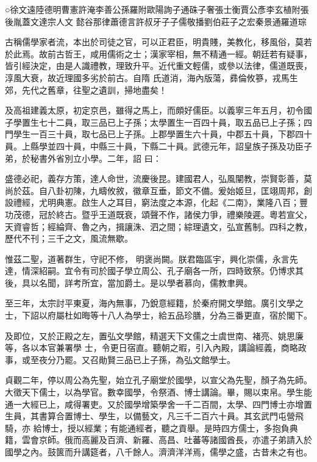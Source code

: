 
\begin{pinyinscope}

 ○徐文遠陸德明曹憲許淹李善公孫羅附歐陽詢子通硃子奢張士衡賈公彥李玄植附張後胤蓋文達宗人文
 懿谷那律蕭德言許叔牙子子儒敬播劉伯莊子之宏秦景通羅道琮



 古稱儒學家者流，本出於司徒之官，可以正君臣，明貴賤，美教化，移風俗，莫若於此焉。故前古哲王，咸用儒術之士；漢家宰相，無不精通一經。朝廷若有疑事，皆引經決定，由是人識禮教，理致升平。近代重文輕儒，或參以法律，儒道既喪，淳風大衰，故近理國多劣於前古。自隋
 氏道消，海內版蕩，彞倫攸篸，戎馬生郊，先代之舊章，往聖之遺訓，掃地盡矣！



 及高祖建義太原，初定京邑，雖得之馬上，而頗好儒臣。以義寧三年五月，初令國子學置生七十二員，取三品已上子孫；太學置生一百四十員，取五品已上子孫；四門學生一百三十員，取七品已上子孫。上郡學置生六十員，中郡五十員，下郡四十員。上縣學並四十員，中縣三十員，下縣二十員。武德元年，詔皇族子孫及功臣子弟，於秘書外省別立小學。二年，詔
 曰：



 盛德必祀，義存方策，達人命世，流慶後昆。建國君人，弘風闡教，崇賢彰善，莫尚於茲。自八卦初陳，九疇攸敘，徽章互垂，節文不備。爰始姬旦，匡翊周邦，創設禮經，尤明典憲。啟生人之耳目，窮法度之本源，化起《二南》，業隆八百；豐功茂德，冠於終古。暨乎王道既衰，頌聲不作，諸侯力爭，禮樂陵遲。粵若宣父，天資睿哲；經綸齊、魯之內，揖讓洙、泗之間；綜理遺文，弘宣舊制。四科之教，歷代不刊；三千之文，風流無歇。



 惟茲二聖，道著群生，守祀不修，
 明褒尚闕。朕君臨區宇，興化崇儒，永言先達，情深紹嗣。宜令有司於國子學立周公、孔子廟各一所，四時致祭。仍博求其後，具以名聞，詳考所宜，當加爵土。是以學者慕向，儒教聿興。



 至三年，太宗討平東夏，海內無事，乃銳意經籍，於秦府開文學館。廣引文學之士，下詔以府屬杜如晦等十八人為學士，給五品珍膳，分為三番更直，宿於閣下。



 及即位，又於正殿之左，置弘文學館，精選天下文儒之士虞世南、褚亮、姚思廉等，各以本官兼署學
 士，令更日宿直。聽朝之暇，引入內殿，講論經義，商略政事，或至夜分乃罷。又召勛賢三品已上子孫，為弘文館學士。



 貞觀二年，停以周公為先聖，始立孔子廟堂於國學，以宣父為先聖，顏子為先師。大徵天下儒士，以為學官。數幸國學，令祭酒、博士講論。畢，賜以束帛。學生能通一大經已上，咸得署吏。又於國學增築學舍一千二百間，太學、四門博士亦增置生員，其書算合置博士、學生，以備藝文，凡三千二百六十員。其玄武門屯營飛騎，亦
 給博士，授以經業；有能通經者，聽之貢舉。是時四方儒士，多抱負典籍，雲會京師。俄而高麗及百濟、新羅、高昌、吐蕃等諸國酋長，亦遣子弟請入於國學之內。鼓篋而升講筵者，八千餘人。濟濟洋洋焉，儒學之盛，古昔未之有也。




\end{pinyinscope}
